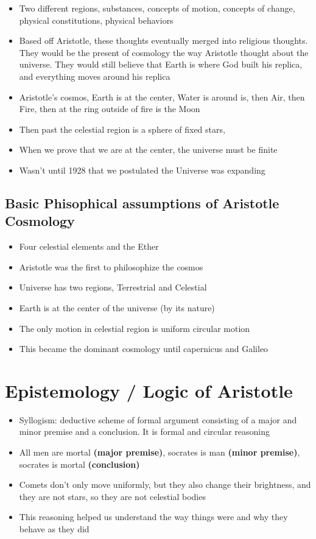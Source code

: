 \documentclass{article}
\begin{document}
\begin{itemize}
    \item Two different regions, substances, concepts of motion,
      concepts of change, physical constitutions,
      physical behaviors
    \item Based off Aristotle, these thoughts eventually merged into
      religious thoughts. They would be the present of cosmology
      the way Aristotle thought about the universe.
      They would still believe that Earth is where God built his replica,
      and everything moves around his replica
    \item Aristotle's cosmos, Earth is at the center,
      Water is around is, then Air, then Fire, then at the ring outside of fire
      is the Moon
    \item Then past the celestial region is a sphere of fixed stars,
    \item When we prove that we are at the center, the universe must be finite
    \item Wasn't until 1928 that we postulated the Universe was expanding
  \end{itemize}

  \subsection{Basic Phisophical assumptions of Aristotle Cosmology}
  \begin{itemize}
    \item Four celestial elements and the Ether
    \item Aristotle was the first to philosophize the cosmos
    \item Universe has two regions, Terrestrial and Celestial
    \item Earth is at the center of the universe (by its nature)
    \item The only motion in celestial region is uniform circular motion
    \item This became the dominant cosmology until
      capernicus and Galileo
  \end{itemize}

  \section*{Epistemology / Logic of Aristotle}
  \begin{itemize}
    \item Syllogism: deductive scheme of formal argument
      consisting of a major and minor premise and a conclusion.
      It is formal and circular reasoning

    \item All men are mortal \textbf{(major premise)}, socrates is man \textbf{(minor premise)},
    socrates is mortal \textbf{(conclusion)}
  \item Comets don't only move uniformly, but they also change their
    brightness, and they are not stars, so they are not celestial bodies
  \item This reasoning helped us understand the
    way things were and why they behave as they did
  \end{itemize}
\end{document}
